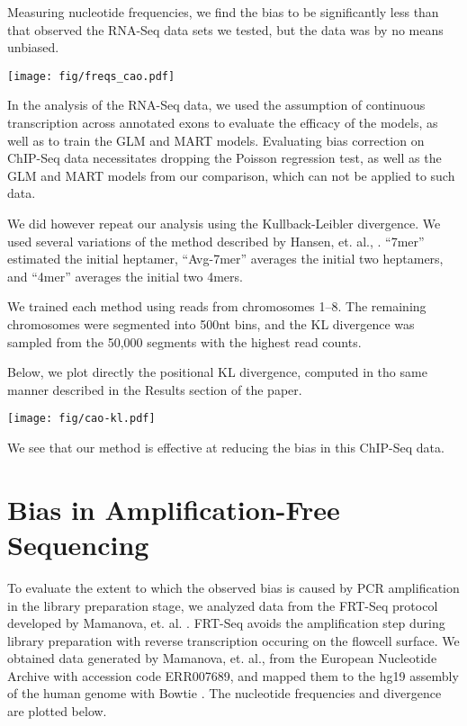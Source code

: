 \documentclass[letterpaper]{article}
\begin{document}
Measuring nucleotide frequencies, we find the bias to be significantly less
than that observed the RNA-Seq data sets we tested, but the data was by no means
unbiased.

\begin{center}
\texttt{[image: fig/freqs\_cao.pdf]}
\end{center}

In the analysis of the RNA-Seq data, we used the assumption of continuous
transcription across annotated exons to evaluate the efficacy of the models, as
well as to train the GLM and MART models. Evaluating bias correction on ChIP-Seq
data necessitates dropping the Poisson regression test, as well as the GLM and
MART models from our comparison, which can not be applied to such data.

We did however repeat our analysis using the Kullback-Leibler divergence.
We used several variations of the method described by Hansen, et. al.,
\cite{Hansen2010}. ``7mer'' estimated the initial heptamer, ``Avg-7mer''
averages the initial two heptamers, and ``4mer'' averages the initial two 4mers.

We trained each method using reads from chromosomes 1--8. The
remaining chromosomes were segmented into 500nt bins, and the KL divergence was
sampled from the 50,000 segments with the highest read counts.

Below, we plot directly the positional KL divergence, computed in tho same
manner described in the Results section of the paper.

\begin{center}
\texttt{[image: fig/cao-kl.pdf]}
\end{center}

We see that our method is effective at reducing the bias in this ChIP-Seq data.



\section{Bias in Amplification-Free Sequencing}

To evaluate the extent to which the observed bias is caused by PCR amplification
in the library preparation stage, we analyzed data from the FRT-Seq protocol
developed by Mamanova, et. al. \cite{Mamanova2010}. FRT-Seq avoids the
amplification step during library preparation with reverse transcription
occuring on the flowcell surface. We obtained data generated by Mamanova, et.
al., from the European Nucleotide Archive with accession code ERR007689, and
mapped them to the hg19 assembly of the human genome with Bowtie
\cite{Langmead2009}. The nucleotide frequencies and divergence are plotted
below.
\end{document}
